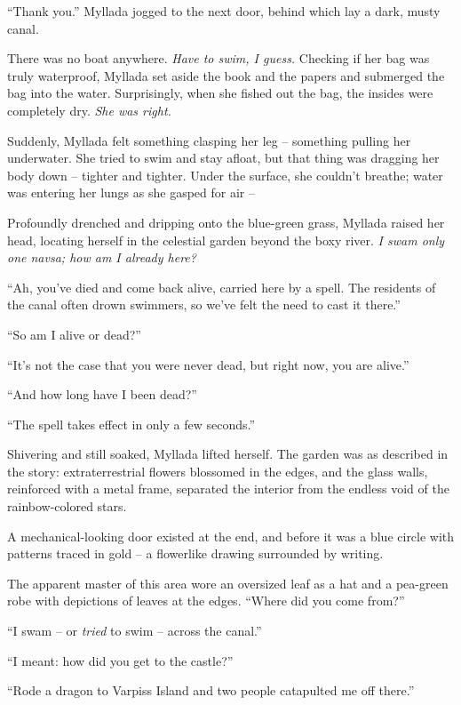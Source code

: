 ``Thank you.'' Myllada jogged to the next door, behind which lay a dark, musty canal.

\centeredstars

There was no boat anywhere. \emph{Have to swim, I guess.} Checking if her bag was truly waterproof, Myllada set aside the book and the papers and submerged the bag into the water. Surprisingly, when she fished out the bag, the insides were completely dry. \emph{She was right.}

Suddenly, Myllada felt something clasping her leg -- something pulling her underwater. She tried to swim and stay afloat, but that thing was dragging her body down -- tighter and tighter. Under the surface, she couldn't breathe; water was entering her lungs as she gasped for air --

\centeredstars

Profoundly drenched and dripping onto the blue-green grass, Myllada raised her head, locating herself in the celestial garden beyond the boxy river. \emph{I swam only one \emph{navsa}; how am I already here?}

``Ah, you've died and come back alive, carried here by a spell. The residents of the canal often drown swimmers, so we've felt the need to cast it there.''

``So am I alive or dead?''

``It's not the case that you were never dead, but right now, you are alive.''

``And how long have I been dead?''

``The spell takes effect in only a few seconds.''

Shivering and still soaked, Myllada lifted herself. The garden was as described in the story: extraterrestrial flowers blossomed in the edges, and the glass walls, reinforced with a metal frame, separated the interior from the endless void of the rainbow-colored stars.

A mechanical-looking door existed at the end, and before it was a blue circle with patterns traced in gold -- a flowerlike drawing surrounded by writing.

The apparent master of this area wore an oversized leaf as a hat and a pea-green robe with depictions of leaves at the edges. ``Where did you come from?''

``I swam -- or \emph{tried} to swim -- across the canal.''

``I meant: how did you get to the castle?''

``Rode a dragon to Varpiss Island and two people catapulted me off there.''

